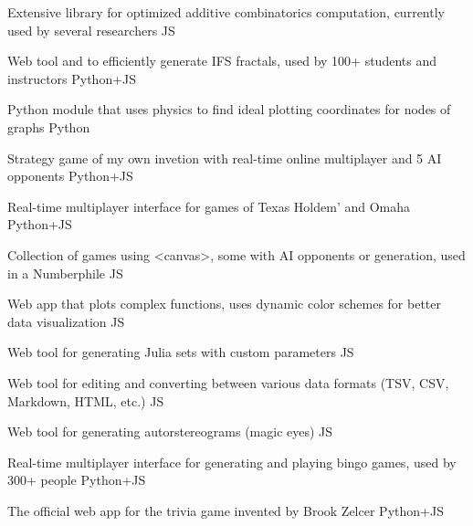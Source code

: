 

\begin{cvprojects}
  
  \cvproject
  {}
  {Extensive library for optimized additive combinatorics computation, currently used by several researchers}
  {JS}

  \cvproject
  {}
  {Web tool and  to efficiently generate IFS fractals, used by 100+ students and instructors}
  {Python+JS}

  \cvproject
  {}
  {Python module that uses physics to find ideal plotting coordinates for nodes of graphs}
  {Python}

  \cvproject
  {}
  {Strategy game of my own invetion with real-time online multiplayer and 5 AI opponents}
  {Python+JS}

  \cvproject
  {}
  {Real-time multiplayer interface for games of Texas Holdem' and Omaha}
  {Python+JS}

  \cvproject
  {}
  {Collection of games using <canvas>, some with AI opponents or generation, used in a Numberphile}
  {JS}

  \cvproject
  {}
  {Web app that plots complex functions, uses dynamic color schemes for better data visualization}
  {JS}

  \cvproject
  {}
  {Web tool for generating Julia sets with custom parameters}
  {JS}
  
  \cvproject
  {}
  {Web tool for editing and converting between various data formats (TSV, CSV, Markdown, HTML, etc.)}
  {JS}

  \cvproject
  {}
  {Web tool for generating autorstereograms (magic eyes)}
  {JS}

  \cvproject
  {}
  {Real-time multiplayer interface for generating and playing bingo games, used by 300+ people}
  {Python+JS}

  \cvproject
  {}
  {The official web app for the trivia game invented by Brook Zelcer}
  {Python+JS}



\end{cvprojects}














